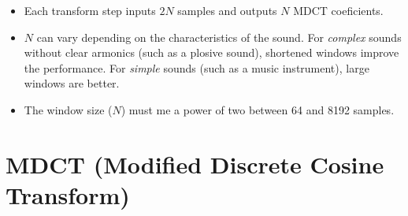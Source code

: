 \begin{itemize}
\item Each transform step inputs $2N$ samples and outputs $N$ MDCT
  coeficients.
\item $N$ can vary depending on the characteristics of the sound. For
  \emph{complex} sounds without clear armonics (such as a plosive
  sound), shortened windows improve the performance. For \emph{simple}
  sounds (such as a music instrument), large windows are better.
\item The window size ($N$) must me a power of two between 64 and 8192
  samples.
\end{itemize}


\section{MDCT (Modified Discrete Cosine Transform)}
